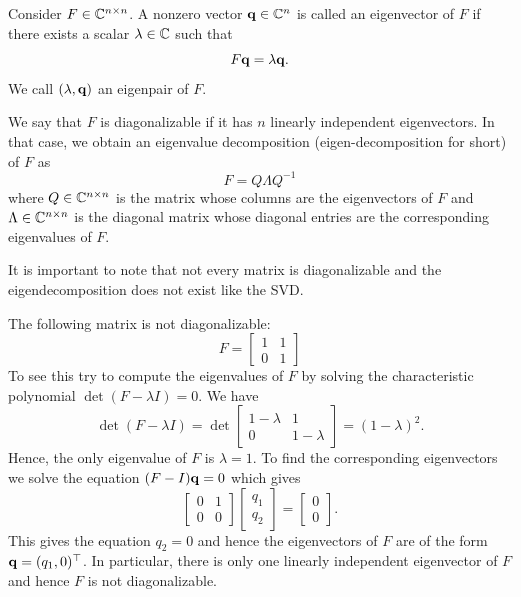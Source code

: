 \begin{definition}
    Consider $F \in \mathbb{C}^{n \times n}$. A nonzero vector $\mathbf{q} \in \mathbb{C}^n$ is called an eigenvector of $F$ if there exists a scalar $\lambda \in \mathbb{C}$ such that
    \begin{equation*}
        F \mathbf{q} = \lambda \mathbf{q}.
    \end{equation*}
    We call $(\lambda, \mathbf{q})$ an eigenpair of $F$.
\end{definition}
We say that $F$ is diagonalizable if it has $n$ 
linearly independent eigenvectors. In that case, we obtain an eigenvalue 
decomposition (eigen-decomposition for short) of $F$ as
\begin{equation*}
    F = Q \Lambda Q^{-1}
\end{equation*}
where $Q \in \mathbb{C}^{n \times n}$ is the matrix whose columns are
the eigenvectors of $F$ and $\Lambda \in \mathbb{C}^{n \times n}$ is the diagonal matrix whose diagonal entries are the corresponding eigenvalues of $F$.

It is important to note that not every matrix is diagonalizable 
and the eigendecomposition does not exist like the SVD.

\begin{example}
    The following matrix is not diagonalizable:
    \begin{equation*}
        F 
= \begin{bmatrix}
            1 & 1 \\
            0 & 1
        \end{bmatrix}
    \end{equation*}
To see this try to compute the eigenvalues of $F$ by solving the characteristic polynomial $\det(F - \lambda I) = 0$. We have
\begin{equation*}
    \det(F - \lambda I) = \det\begin{bmatrix}
        1 - \lambda & 1 \\
        0 & 1 - \lambda
    \end{bmatrix} = (1 - \lambda)^2.
\end{equation*}
Hence, the only eigenvalue of $F$ is $\lambda = 1$. To find the corresponding eigenvectors we solve the equation $(F - I)\mathbf{q} = 0$ which gives
\begin{equation*}
    \begin{bmatrix}
        0 & 1 \\
        0 & 0
    \end{bmatrix} \begin{bmatrix}
        q_1 \\
        q_2
    \end{bmatrix} = \begin{bmatrix}
        0 \\
        0
    \end{bmatrix}.
\end{equation*}
This gives the equation $q_2 = 0$ and hence the eigenvectors of $F$ are of the form $\mathbf{q} = (q_1, 0)^\top$. In particular, there is only one linearly independent eigenvector of $F$ and hence $F$ is not diagonalizable.
\end{example}


